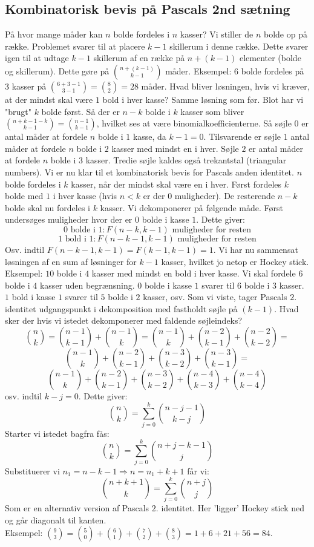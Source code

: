 \subsection{Kombinatorisk bevis på Pascals 2nd sætning}
På hvor mange måder kan \(n\) bolde fordeles i \(n\) kasser? Vi stiller de \(n\) bolde op på række. Problemet svarer til at placere \(k-1\) skillerum i denne række. Dette svarer igen til at udtage \(k-1\) skillerum af en række på \(n+(k-1)\) elementer (bolde og skillerum). Dette gøre på \(\binom{n+(k-1)}{k-1}\) måder. Eksempel: \(6\) bolde fordeles på \(3\) kasser på \(\binom{6+3-1}{3-1}=\binom{8}{2}=28\) måder. Hvad bliver løsningen, hvis vi kræver, at der mindst skal være \(1\) bold i hver kasse? Samme løsning som før. Blot har vi "brugt" \(k\) bolde først. Så der er \(n-k\) bolde i \(k\) kasser som bliver \(\binom{n+k-1-k}{k-1}=\binom{n-1}{k-1}\), hvilket ses at være binomialkoefficienterne. Så søjle \(0\) er antal måder at fordele \(n\) bolde i \(1\) kasse, da \(k-1=0\). Tilsvarende er søjle \(1\) antal måder at fordele \(n\) bolde i \(2\) kasser med mindst en i hver. Søjle \(2\) er antal måder at fordele \(n\) bolde i \(3\) kasser. Tredie søjle kaldes også trekantstal (triangular numbers). Vi er nu klar til et kombinatorisk bevis for Pascals anden identitet. \(n\) bolde fordeles i \(k\) kasser, når der mindst skal være en i hver. Først fordeles \(k\) bolde med \(1\) i hver kasse (hvis \(n<k\) er der \(0\) muligheder). De resterende \(n-k\) bolde skal nu fordeles i \(k\) kasser. Vi dekomponerer på følgende måde. Først undersøges muligheder hvor der er \(0\) bolde i kasse \(1\). Dette giver:
\[0 \text{ bolde i }1: F(n-k,k-1) \text{ muligheder for resten}\]
\[1 \text{ bold i }1: F(n-k-1,k-1) \text{ muligheder for resten}\]
Osv. indtil \(F(n-k-1,k-1)=F(k-1,k-1)=1\). Vi har nu sammensat løsningen af en sum af løsninger for \(k-1\) kasser, hvilket jo netop er Hockey stick. Eksempel: \(10\) bolde i \(4\) kasser med mindst en bold i hver kasse. Vi skal fordele \(6\) bolde i \(4\) kasser uden begrænsning. \(0\) bolde i kasse \(1\) svarer til \(6\) bolde i \(3\) kasser. \(1\) bold i kasse \(1\) svarer til \(5\) bolde i \(2\) kasser, osv. Som vi viste, tager Pascals \(2.\) identitet udgangspunkt i dekomposition med fastholdt søjle på \((k-1)\). Hvad sker der hvis vi istedet dekomponerer med faldende søjleindeks?
\[\binom{n}{k}=\binom{n-1}{k-1}+\binom{n-1}{k}=\binom{n-1}{k}+\binom{n-2}{k-1}+\binom{n-2}{k-2}=\]
\[\binom{n-1}{k}+\binom{n-2}{k-1}+\binom{n-3}{k-2}+\binom{n-3}{k-1}=\]
\[\binom{n-1}{k}+\binom{n-2}{k-1}+\binom{n-3}{k-2}+\binom{n-4}{k-3}+\binom{n-4}{k-4}\]
osv. indtil \(k-j=0\). Dette giver:
\[\binom{n}{k}=\sum_{j=0}^{k}\binom{n-j-1}{k-j}\]
Starter vi istedet bagfra fås:
\[\binom{n}{k}=\sum_{j=0}^{k}\binom{n+j-k-1}{j}\]
Substituerer vi \(n_{1}=n-k-1 \Rightarrow n=n_{1}+k+1\) får vi:
\[\binom{n+k+1}{k}=\sum_{j=0}^{k}\binom{n+j}{j }\]
Som er en alternativ version af Pascals \(2.\) identitet. Her 'ligger' Hockey stick ned og går diagonalt til kanten.\\ 
Eksempel: \(\binom{9}{3}=\binom{5}{0}+\binom{6}{1}+\binom{7}{2}+\binom{8}{3}=1+6+21+56=84\).
